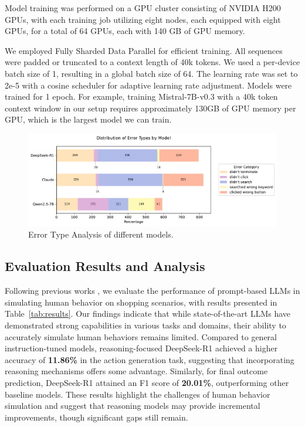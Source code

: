 \documentclass[11pt]{article}
\begin{document}
Model training was performed on a GPU cluster consisting of NVIDIA H200 GPUs, with each training job utilizing eight nodes, each equipped with eight GPUs, for a total of 64 GPUs, each with 140 GB of GPU memory.

We employed Fully Sharded Data Parallel \cite{zhaoPyTorchFSDPExperiences2023} for efficient training. All sequences were padded or truncated to a context length of 40k tokens. We used a per-device batch size of 1, resulting in a global batch size of 64. The learning rate was set to 2e-5 with a cosine scheduler for adaptive learning rate adjustment. Models were trained for 1 epoch. For example, training Mistral-7B-v0.3 with a 40k token context window in our setup requires approximately 130GB of GPU memory per GPU, which is the largest model we can train.



\begin{figure}
    \centering
    \includegraphics[width=.8\linewidth]{figures/error_analysis.pdf}
    \caption{Error Type Analysis of different models.}
    \label{fig:error-analysis}
\end{figure}


\subsection{Evaluation Results and Analysis}



Following previous works \cite{lutzWILBURAdaptiveInContext2024, dengMind2WebGeneralistAgent2023}, we evaluate the performance of prompt-based LLMs in simulating human behavior on shopping scenarios, with results presented in Table~\ref{tab:results}.
Our findings indicate that while state-of-the-art LLMs have demonstrated strong capabilities in various tasks and domains, their ability to accurately simulate human behaviors remains limited.
Compared to general instruction-tuned models, reasoning-focused DeepSeek-R1 achieved a higher accuracy of \textbf{11.86\%} in the action generation task, suggesting that incorporating reasoning mechanisms offers some advantage.
Similarly, for final outcome prediction, DeepSeek-R1 attained an F1 score of \textbf{20.01\%}, outperforming other baseline models.
These results highlight the challenges of human behavior simulation and suggest that reasoning models may provide incremental improvements, though significant gaps still remain.
\end{document}
